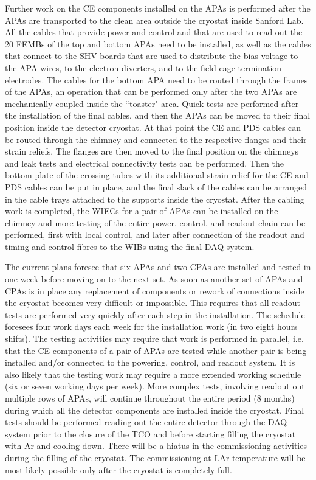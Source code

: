Further work on the CE components installed on the APAs is performed after
the APAs are transported to the clean area outside the cryostat inside
Sanford Lab. All the cables that provide power and control and that are used
to read out the 20 FEMBs of the top and bottom APAs need to be installed,
as well as the cables that connect to the SHV boards that are used to
distribute the bias voltage to the APA wires, to the electron diverters,
and to the field cage termination electrodes. The cables for the bottom
APA need to be routed through the frames of the APAs, an operation that
can be performed only after the two APAs are mechanically coupled inside
the ``toaster" area. Quick tests are performed after the installation of the
final cables, and then the APAs can be moved to their final position inside
the detector cryostat. At that point the CE and PDS cables can be routed
through the chimney and connected to the respective flanges and their strain
reliefs. The flanges are then moved to the final position on the chimneys
and leak tests and electrical connectivity tests can be performed. Then the
bottom plate of the crossing tubes with its additional strain relief for
the CE and PDS cables can be put in place, and the final slack of the cables
can be arranged in the cable trays attached to the supports inside the cryostat.
After the cabling work is completed, the WIECs for a pair of APAs can be
installed on the chimney and more testing of the entire power, control,
and readout chain can be performed, first with local control, and later
after connection of the readout and timing and control fibres to the WIBs
using the final DAQ system.

The current plans foresee that six APAs and two CPAs are installed and
tested in one week before moving on to the next set. As soon as another
set of APAs and CPAs is in place any replacement of components or rework
of connections inside the cryostat becomes very difficult or impossible.
This requires that all readout tests are performed very quickly after
each step in the installation. The schedule foresees four work days each
week for the installation work (in two eight hours shifts). The testing
activities may require that work is performed in parallel, i.e. that
the CE components of a pair of APAs are tested while another pair is
being installed and/or connected to the powering, control, and readout
system. It is also likely that the testing work may require a more
extended working schedule (six or seven working days per week). More
complex tests, involving readout out multiple rows of APAs, will continue
throughout the entire period (8 months) during which all the detector
components are installed inside the cryostat. Final tests should be
performed reading out the entire detector through the DAQ system
prior to the closure of the TCO and before starting filling the cryostat
with Ar and cooling down. There will be a hiatus in
the commissioning activities during the filling of the cryostat. The
commissioning at LAr temperature will be most likely possible only
after the cryostat is completely full.
